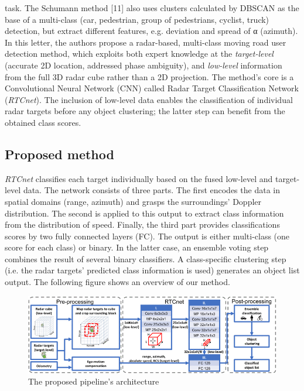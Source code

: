 task. The Schumann method {[}11{]} also uses clusters calculated by
DBSCAN as the base of a multi-class (car, pedestrian, group of
pedestrians, cyclist, truck) detection, but extract different features,
e.g. deviation and spread of α (azimuth). In this letter, the authors
propose a radar-based, multi-class moving road user detection method,
which exploits both expert knowledge at the \emph{target-level}
(accurate 2D location, addressed phase ambiguity), and \emph{low-level}
information from the full 3D radar cube rather than a 2D projection. The
method's core is a Convolutional Neural Network (CNN) called Radar
Target Classification Network (\emph{RTCnet}). The inclusion of
low-level data enables the classification of individual radar targets
before any object clustering; the latter step can benefit from the
obtained class scores.

\subsection{Proposed method}\label{header-n363}

\emph{RTCnet} classifies each target individually based on the fused
low-level and target-level data. The network consists of three parts.
The first encodes the data in spatial domains (range, azimuth) and
grasps the surroundings' Doppler distribution. The second is applied to
this output to extract class information from the distribution of speed.
Finally, the third part provides classifications scores by two fully
connected layers (FC). The output is either multi-class (one score for
each class) or binary. In the latter case, an ensemble voting step
combines the result of several binary classifiers. A class-specific
clustering step (i.e. the radar targets' predicted class information is
used) generates an object list output. The following figure shows an
overview of our method.

\begin{figure}[h!]
\centering
\includegraphics[width=0.95\linewidth]{images/pipelineoverview.png}
\caption{The proposed pipeline's architecture}
\end{figure}

